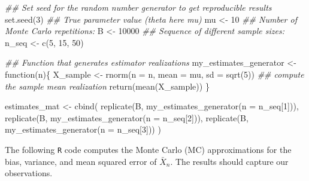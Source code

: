 \documentclass[
  letterpaper,
  DIV=11,
  numbers=noendperiod]{scrreprt}
\newenvironment{Shaded}{\begin{snugshade}}{\end{snugshade}}
\newcommand{\AttributeTok}[1]{\textcolor[rgb]{0.40,0.45,0.13}{#1}}
\newcommand{\ControlFlowTok}[1]{\textcolor[rgb]{0.00,0.23,0.31}{#1}}
\newcommand{\DecValTok}[1]{\textcolor[rgb]{0.68,0.00,0.00}{#1}}
\newcommand{\DocumentationTok}[1]{\textcolor[rgb]{0.37,0.37,0.37}{\textit{#1}}}
\newcommand{\FunctionTok}[1]{\textcolor[rgb]{0.28,0.35,0.67}{#1}}
\newcommand{\NormalTok}[1]{\textcolor[rgb]{0.00,0.23,0.31}{#1}}
\newcommand{\OtherTok}[1]{\textcolor[rgb]{0.00,0.23,0.31}{#1}}
\theoremstyle{definition}
\theoremstyle{plain}
\theoremstyle{plain}
\theoremstyle{remark}
\begin{document}
\begin{Shaded}
\begin{Highlighting}[]
\DocumentationTok{\#\# Set seed for the random number generator to get reproducible results}
\FunctionTok{set.seed}\NormalTok{(}\DecValTok{3}\NormalTok{)}
\DocumentationTok{\#\# True parameter value (\textquotesingle{}theta\textquotesingle{} here \textquotesingle{}mu\textquotesingle{})}
\NormalTok{mu            }\OtherTok{\textless{}{-}} \DecValTok{10}
\DocumentationTok{\#\# Number of Monte Carlo repetitions:}
\NormalTok{B             }\OtherTok{\textless{}{-}} \DecValTok{10000}
\DocumentationTok{\#\# Sequence of different sample sizes:}
\NormalTok{n\_seq         }\OtherTok{\textless{}{-}} \FunctionTok{c}\NormalTok{(}\DecValTok{5}\NormalTok{, }\DecValTok{15}\NormalTok{, }\DecValTok{50}\NormalTok{)}

\DocumentationTok{\#\# Function that generates estimator realizations }
\NormalTok{my\_estimates\_generator }\OtherTok{\textless{}{-}} \ControlFlowTok{function}\NormalTok{(n)\{}
\NormalTok{  X\_sample }\OtherTok{\textless{}{-}} \FunctionTok{rnorm}\NormalTok{(}\AttributeTok{n =}\NormalTok{ n, }\AttributeTok{mean =}\NormalTok{ mu, }\AttributeTok{sd =} \FunctionTok{sqrt}\NormalTok{(}\DecValTok{5}\NormalTok{))}
  \DocumentationTok{\#\# compute the sample mean realization}
  \FunctionTok{return}\NormalTok{(}\FunctionTok{mean}\NormalTok{(X\_sample))}
\NormalTok{\}}

\NormalTok{estimates\_mat }\OtherTok{\textless{}{-}} \FunctionTok{cbind}\NormalTok{(}
  \FunctionTok{replicate}\NormalTok{(B, }\FunctionTok{my\_estimates\_generator}\NormalTok{(}\AttributeTok{n =}\NormalTok{ n\_seq[}\DecValTok{1}\NormalTok{])),}
  \FunctionTok{replicate}\NormalTok{(B, }\FunctionTok{my\_estimates\_generator}\NormalTok{(}\AttributeTok{n =}\NormalTok{ n\_seq[}\DecValTok{2}\NormalTok{])),}
  \FunctionTok{replicate}\NormalTok{(B, }\FunctionTok{my\_estimates\_generator}\NormalTok{(}\AttributeTok{n =}\NormalTok{ n\_seq[}\DecValTok{3}\NormalTok{]))}
\NormalTok{)}
\end{Highlighting}
\end{Shaded}

The following \texttt{R} code computes the Monte Carlo (MC)
approximations for the bias, variance, and mean squared error of
\(\bar{X}_n\). The results should capture our observations.
\end{document}
